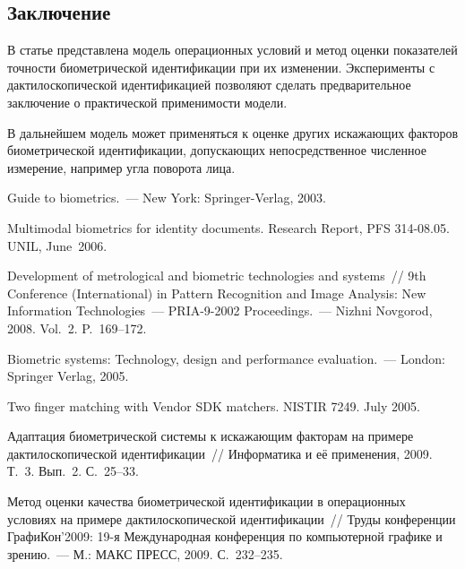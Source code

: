 \begin{multicols}{2}

\section{Заключение}

В статье представлена модель операционных условий и метод оценки показателей точности 
биометрической идентификации при их изменении. Эксперименты с дактилоскопической 
идентификацией позволяют сделать предварительное заключение о практической применимости 
модели. 

В дальнейшем модель может применяться к оценке других искажающих факторов 
биометрической идентификации, допускающих непосредственное численное измерение, 
например угла поворота лица.


{\small\frenchspacing
{%
\begin{thebibliography}{99}

Guide to biometrics.~--- New York: Springer-Verlag, 2003.

Multimodal biometrics for identity documents. Research Report, PFS 314-08.05. UNIL, June~2006.

Development of metrological and biometric technologies and systems~// 9th Conference (International) 
in Pattern Recognition and Image Analysis: New Information Technologies~--- PRIA-9-2002 
Proceedings.~--- Nizhni Novgorod, 2008. Vol.~2. P.~169--172.

Biometric systems: Technology, design and performance evaluation.~--- London: 
Springer Verlag, 2005.

Two finger matching with Vendor SDK matchers. NISTIR 7249. July 2005.

Адаптация биометрической системы к искажающим факторам на примере 
дактилоскопической идентификации~// Информатика и её применения, 2009. Т.~3. 
Вып.~2. С.~25--33.
\pagebreak

Метод оценки качества биометрической идентификации в операционных условиях 
на примере дактилоскопической идентификации~// Труды конференции 
ГрафиКон'2009: 19-я Международная конференция по компьютерной графике и 
зрению.~--- М.: МАКС ПРЕСС, 2009. С.~232--235.


\end{thebibliography}}}
\end{multicols}
